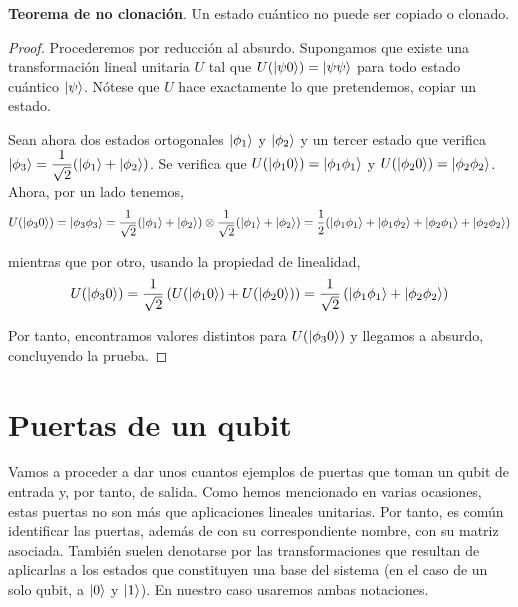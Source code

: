 \begin{thm} \textbf{Teorema de no clonación}. Un estado cuántico no puede ser copiado o clonado.
\begin{proof}
Procederemos por reducción al absurdo. Supongamos que existe una transformación lineal unitaria $U$ tal que $U(\left|\psi0\right\rangle)=\left|\psi\psi\right\rangle$ para todo estado cuántico $\left|\psi\right\rangle$. Nótese que $U$ hace exactamente lo que pretendemos, copiar un estado.

Sean ahora dos estados ortogonales $\left|\phi_1\right\rangle$ y $\left|\phi_2\right\rangle$ y un tercer estado que verifica $\left|\phi_3\right\rangle=\dfrac{1}{\sqrt{2}}(\left|\phi_1\right\rangle+\left|\phi_2\right\rangle)$. Se verifica que $U(\left|\phi_10\right\rangle)=\left|\phi_1\phi_1\right\rangle$ y $U(\left|\phi_20\right\rangle)=\left|\phi_2\phi_2\right\rangle$. Ahora, por un lado tenemos,
\[U(\left|\phi_30\right\rangle)=\left|\phi_3\phi_3\right\rangle=\dfrac{1}{\sqrt{2}}(\left|\phi_1\right\rangle+\left|\phi_2\right\rangle)\otimes\dfrac{1}{\sqrt{2}}(\left|\phi_1\right\rangle+\left|\phi_2\right\rangle)=\dfrac{1}{2}(\left|\phi_1\phi_1\right\rangle+\left|\phi_1\phi_2\right\rangle+\left|\phi_2\phi_1\right\rangle+\left|\phi_2\phi_2\right\rangle)\]

mientras que por otro, usando la propiedad de linealidad,
\[U(\left|\phi_30\right\rangle)=\dfrac{1}{\sqrt{2}}\left(U(\left|\phi_10\right\rangle)+U(\left|\phi_20\right\rangle)\right)=\dfrac{1}{\sqrt{2}}\left(\left|\phi_1\phi_1\right\rangle+\left|\phi_2\phi_2\right\rangle\right)\]

Por tanto, encontramos valores distintos para $U(\left|\phi_30\right\rangle)$ y llegamos a absurdo, concluyendo la prueba.
\end{proof}
\end{thm}

\section{Puertas de un qubit}

Vamos a proceder a dar unos cuantos ejemplos de puertas que toman un qubit de entrada y, por tanto, de salida. Como hemos mencionado en varias ocasiones, estas puertas no son más que aplicaciones lineales unitarias. Por tanto, es común identificar las puertas, además de con su correspondiente nombre, con su matriz asociada. También suelen denotarse por las transformaciones que resultan de aplicarlas a los estados que constituyen una base del sistema (en el caso de un solo qubit, a $\left|0\right\rangle$ y $\left|1\right\rangle$). En nuestro caso usaremos ambas notaciones.

